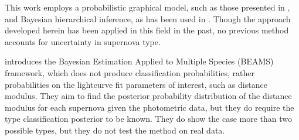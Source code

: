\documentclass[12pt, onecolumn]{emulateapj}
\begin{document}
This work employs a probabilistic graphical model, such as those presented in \citet{March11, Rubin15, Ma16}, and Bayesian hierarchical inference, as has been used in \citet{Kunz07, Mandel16}.  Though the approach developed herein has been applied in this field in the past, no previous method accounts for uncertainty in supernova type.

\citet{Kunz07} introduces the Bayesian Estimation Applied to Multiple Species (BEAMS) framework, which does not produce classification probabilities, rather probabilities on the lightcurve fit parameters of interest, such as distance modulus.  They aim to find the posterior probability distribution of the distance modulus for each supernova given the photometric data, but they do require the type classification posterior to be known.  They do show the case more than two possible types, but they do not test the method on real data.
\end{document}
